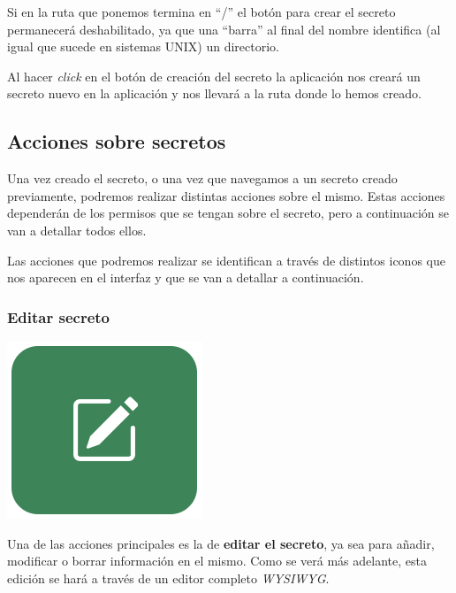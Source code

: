 \documentclass{\ClassPath/viu-tfm-template}
\begin{document}
Si en la ruta que ponemos termina en “/” el botón para crear el secreto permanecerá deshabilitado, ya que una “barra” al final del nombre identifica (al igual que sucede en sistemas UNIX) un directorio.

Al hacer \textit{click} en el botón de creación del secreto la aplicación nos creará un secreto nuevo en la aplicación y nos llevará a la ruta donde lo hemos creado.

\subsection{Acciones sobre secretos}

Una vez creado el secreto, o una vez que navegamos a un secreto creado previamente, podremos realizar distintas acciones sobre el mismo. Estas acciones dependerán de los permisos que se tengan sobre el secreto, pero a continuación se van a detallar todos ellos.

Las acciones que podremos realizar se identifican a través de  distintos iconos que nos aparecen en el interfaz y que se van a detallar a continuación.


\subsubsection*{Editar secreto}
{
\begin{minipage}{0.1\linewidth}
    \includegraphics[width=\linewidth]{img/edit.png}
\end{minipage}
\hspace{0.5cm}
\begin{minipage}{0.9\linewidth}
    Una de las acciones principales es la de \textbf{editar el secreto}, ya sea para añadir, modificar o borrar información en el mismo. Como se verá más adelante, esta edición se hará a través de un editor completo \textit{WYSIWYG}.
\end{minipage}
}
\end{document}

